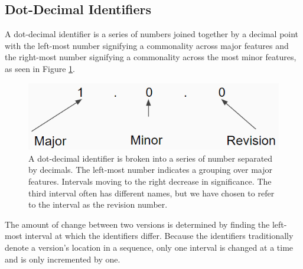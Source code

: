 \subsection{Dot-Decimal Identifiers}
A dot-decimal identifier is a series of numbers joined together by a decimal point with the left-most number signifying a commonality across major features and the right-most number signifying a commonality across the most minor features, as seen in Figure \ref{dot_decimal}.
\begin{figure}
	\centering
	\includegraphics[scale=0.9]{dot_decimal.png}
	\caption{A dot-decimal identifier is broken into a series of number separated by decimals.  The left-most number indicates a grouping over major features.  Intervals moving to the right decrease in significance.  The third interval often has different names, but we have chosen to refer to the interval as the revision number.}
	\label{dot_decimal}
\end{figure}
The amount of change between two versions is determined by finding the left-most interval at which the identifiers differ.
Because the identifiers traditionally denote a version's location in a sequence, only one interval is changed at a time and is only incremented by one.